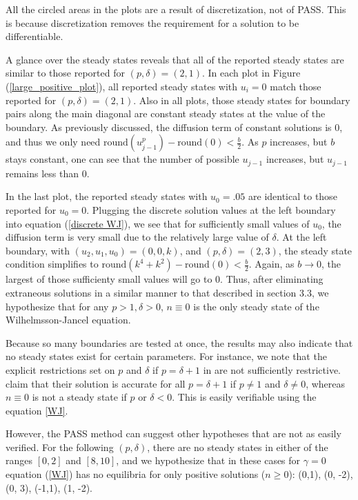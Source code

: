 \documentclass{article}
\begin{document}
All the circled areas in the plots are a result of discretization, not of PASS. This is because discretization removes the requirement for a solution to be differentiable. 

A glance over the steady states reveals that all of the reported steady states are similar to those reported for $(p, \delta) = (2,1)$. In each plot in Figure (\ref{large_positive_plot}), all reported steady states with $u_i = 0$ match those reported for $(p, \delta) = (2,1)$. Also in all plots, those steady states for boundary pairs along the main diagonal are constant steady states at the value of the boundary. As previously discussed, the diffusion term of constant solutions is 0, and thus we only need $\text{round}(u_{j-1}^p) - \text{round}(0) < \frac{b}{2}$. As $p$ increases, but $b$ stays constant, one can see that the number of possible $u_{j-1}$ increases, but $u_{j-1}$ remains less than 0. 

In the last plot, the reported steady states with $u_0 = .05$ are identical to those reported for $u_0 = 0$. Plugging the discrete solution values at the left boundary into equation (\ref{discrete WJ}), we see that for sufficiently small values of $u_0$, the diffusion term is very small due to the relatively large value of $\delta$. At the left boundary, with $(u_2, u_1, u_0) = (0,0,k)$, and $(p, \delta) = (2,3)$, the steady state condition simplifies to $\text{round}(k^4 + k^2) - \text{round}(0) < \frac{b}{2}$. Again, as $b \rightarrow 0$, the largest of those sufficienty small values will go to 0. Thus, after eliminating extraneous solutions in a similar manner to that described in section 3.3, we hypothesize that for any $p > 1, \delta > 0$, $n \equiv 0$ is the only steady state of the Wilhelmsson-Jancel equation.

Because so many boundaries are tested at once, the results may also indicate that no steady states exist for certain parameters. For instance, we note that the explicit restrictions set on $p$ and $\delta$ if $p = \delta + 1$ in \citep{WJ} are not sufficiently restrictive. \citep{WJ} claim that their solution is accurate for all $p = \delta + 1$ if $p \ne 1$ and $\delta \ne 0$, whereas $n \equiv 0$ is not a steady state if $p$ or $\delta < 0$. This is easily verifiable using the equation \ref{WJ}. 

However, the PASS method can suggest other hypotheses that are not as easily verified. For the following $(p, \delta)$, there are no steady states in either of the ranges $[0,2]$ and $[8,10]$, and we hypothesize that in these cases for $\gamma = 0$ equation (\ref{WJ}) has no equilibria for only positive solutions ($n \ge 0$): (0,1), (0, -2), (0, 3), (-1,1), (1, -2).
\end{document}
